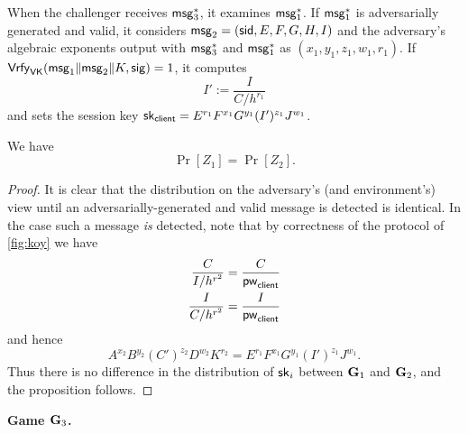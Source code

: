 When the challenger receives $\mathsf{msg}_{3}^{*}$, it examines $\mathsf{msg}_{1}^{*}$. If $\mathsf{msg}_{1}^{*}$ is adversarially generated and valid, it considers $\mathsf{msg}_{2} = (\mathsf{sid}, E, F, G, H, I)$ and the adversary's algebraic exponents output with $\mathsf{msg}_{3}^{*}$ and $\mathsf{msg}_{1}^{*}$ as $(x_1,y_1,z_1,w_1,r_1)$. If $\mathsf{Vrfy}_{\mathsf{VK}}(\mathsf{msg}_{1}\|\mathsf{msg}_{2}\|K,\mathsf{sig})=1$, it computes $$I':= \frac{I}{C/h^{r_1}}$$ and sets the session key $\mathsf{sk}_{\mathsf{client}} = E^{r_1}F^{x_1}G^{y_1}(I')^{z_1}J^{w_1}$.

\begin{lemma} We have
	$$\Pr[Z_1]=\Pr[Z_2].$$
\end{lemma}

\begin{proof}
	It is clear that the distribution on the adversary's (and environment's) view until an adversarially-generated and valid message is detected is identical. In the case such a message \textit{is} detected, note that by correctness of the protocol of \cref{fig:koy} we have
	\begin{align*}
		\frac{C}{I/h^{r^2}} = \frac{C}{\mathsf{pw}_{\mathsf{client}}}\\
		\frac{I}{C/h^{r^2}} = \frac{I}{\mathsf{pw}_{\mathsf{client}}}
	\end{align*}
	and hence $$A^{x_2}B^{y_2}(C')^{z_2}D^{w_2}K^{r_2} = E^{r_1}F^{x_1}G^{y_1}(I')^{z_1}J^{w_1}.$$ Thus there is no difference in the distribution of $\mathsf{sk}_i$ between $\mathbf{G}_1$ and $\mathbf{G}_2$, and the proposition follows.
\end{proof}

\textbf{Game $\mathbf{G}_3$.}